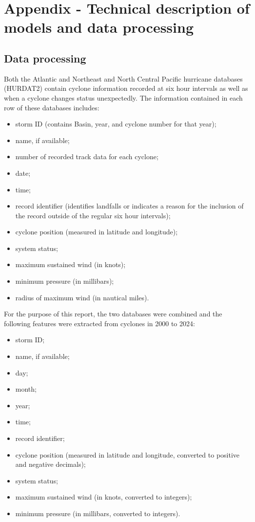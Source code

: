 \documentclass[
]{article}
\providecommand{\tightlist}{%
  \setlength{\itemsep}{0pt}\setlength{\parskip}{0pt}}
\begin{document}
\newpage

\section{Appendix - Technical description of models and data processing}\label{appendix---technical-description-of-models-and-data-processing}

\subsection{Data processing}\label{data-processing}

Both the Atlantic and Northeast and North Central Pacific hurricane databases (HURDAT2) contain cyclone information recorded at six hour intervals as well as when a cyclone changes status unexpectedly. The information contained in each row of these databases includes:

\begin{itemize}
\tightlist
\item
  storm ID (contains Basin, year, and cyclone number for that year);
\item
  name, if available;
\item
  number of recorded track data for each cyclone;
\item
  date;
\item
  time;
\item
  record identifier (identifies landfalls or indicates a reason for the inclusion of the record outside of the regular six hour intervals);
\item
  cyclone position (measured in latitude and longitude);
\item
  system status;
\item
  maximum sustained wind (in knots);
\item
  minimum pressure (in millibars);
\item
  radius of maximum wind (in nautical miles).
\end{itemize}

For the purpose of this report, the two databases were combined and the following features were extracted from cyclones in 2000 to 2024:

\begin{itemize}
\tightlist
\item
  storm ID;
\item
  name, if available;
\item
  day;
\item
  month;
\item
  year;
\item
  time;
\item
  record identifier;
\item
  cyclone position (measured in latitude and longitude, converted to positive and negative decimals);
\item
  system status;
\item
  maximum sustained wind (in knots, converted to integers);
\item
  minimum pressure (in millibars, converted to integers).
\end{itemize}
\end{document}
